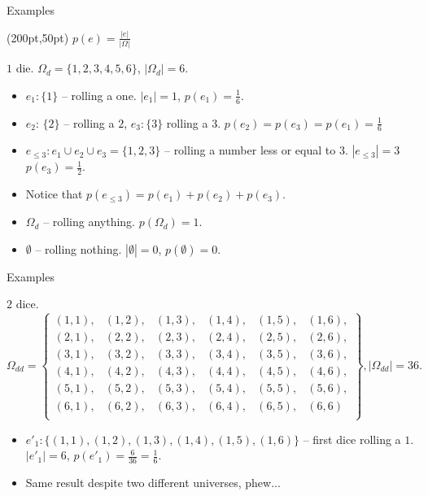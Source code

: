 \documentclass{beamer}
\begin{document}
\begin{frame}{Examples}
  \begin{textblock*}{100pt}(200pt,50pt)
     $p(e) = \frac{|e|}{|\Omega|}$
  \end{textblock*}
  \begin{exampleblock}{$1$ die.}
    $\Omega_{d}= \{ 1, 2, 3, 4, 5, 6 \}$, $|\Omega_d| = 6$.
    \begin{itemize}
    \item $e_1: \{1\}$ -- rolling a one. $|e_1| = 1$, $p(e_1) = \frac{1}{6}$.
    \item $e_2$: $\{2\}$ -- rolling a $2$, $e_3: \{3\}$ rolling a $3$. $p(e_2) = p(e_3) = p(e_1) = \frac{1}{6}$ 
    \item $e_{\le 3}: e_1 \cup e_2 \cup e_3 = \{1,2,3\}$ -- rolling a number less or equal to $3$. $|e_{\le 3}| = 3$ $p(e_3) = \frac{1}{2}$.
    \item Notice that $p(e_{\le 3}) = p(e_1) + p(e_2) + p(e_3)$.
    \item $\Omega_d$ -- rolling anything. $p(\Omega_d) = 1$.
    \item $\emptyset$ -- rolling nothing. $|\emptyset| = 0$, $p(\emptyset) = 0$.
    \end{itemize}
  \end{exampleblock}
\end{frame}

\begin{frame}{Examples}
  \begin{exampleblock}{$2$ dice.}
    \[ \Omega_{dd} = \left\{ \begin{array}{llllll}
      (1, 1), &(1, 2), &(1, 3), &(1, 4), &(1, 5), &(1, 6),\\
      (2, 1), &(2, 2), &(2, 3), &(2, 4), &(2, 5), &(2, 6),\\
      (3, 1), &(3, 2), &(3, 3), &(3, 4), &(3, 5), &(3, 6),\\
      (4, 1), &(4, 2), &(4, 3), &(4, 4), &(4, 5), &(4, 6),\\
      (5, 1), &(5, 2), &(5, 3), &(5, 4), &(5, 5), &(5, 6),\\
      (6, 1), &(6, 2), &(6, 3), &(6, 4), &(6, 5), &(6, 6)\\
      \end{array}
    \right \}, |\Omega_{dd}| = 36.\]
    \begin{itemize}
    \item $e'_1: \{ (1, 1), (1, 2), (1, 3), (1, 4), (1, 5), (1, 6)\}$ -- first dice rolling a $1$. $|e'_1| = 6$, $p(e'_1) = \frac{6}{36} = \frac{1}{6}$.
    \item Same result despite two different universes, phew...
    \end{itemize}
  \end{exampleblock}  
\end{frame}
\end{document}
